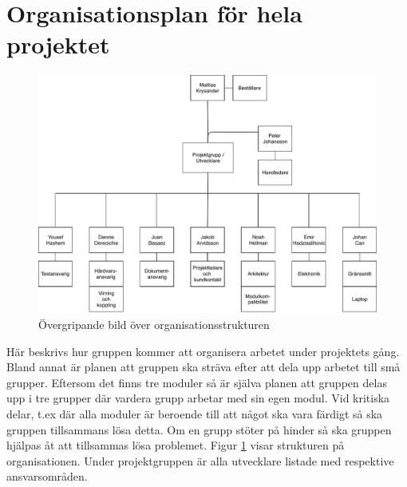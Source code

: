 \documentclass[projektplan/plan.tex]{subfiles}
\begin{document}
\section{Organisationsplan för hela projektet}

\begin{figure}[h]
    \centering
    \includegraphics[width=0.6\linewidth]{projektplan/figures/orgplan.pdf}
    \caption{Övergripande bild över organisationsstrukturen}
    \label{fig:orgplan}
\end{figure}
\noindent
Här beskrivs hur gruppen kommer att organisera arbetet under projektets gång.
Bland annat är planen att gruppen ska sträva efter att dela upp arbetet till
små grupper. Eftersom det finns tre moduler så är själva planen att gruppen
delas upp i tre grupper där vardera grupp arbetar med sin egen modul. Vid
kritiska delar, t.ex där alla moduler är beroende till att något ska vara
färdigt så ska gruppen tillsammans lösa detta. Om en grupp stöter på hinder så
ska gruppen hjälpas åt att tillsammas lösa problemet. Figur \ref{fig:orgplan}
visar strukturen på organisationen. Under projektgruppen är alla utvecklare
listade med respektive ansvarsområden.  
\end{document}
